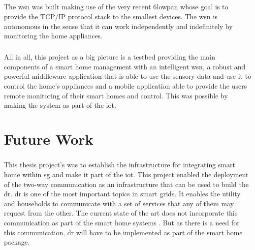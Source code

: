\documentclass[oneside,12pt,a4paper,final]{book}
\begin{document}
\paragraph{}
The \gls{wsn} was built making use of the very recent \gls{6lowpan} whose goal is to provide the TCP/IP protocol stack to the smallest devices. The \gls{wsn} is autonomous in the sense that it can work independently and indefinitely by monitoring the home appliances. 
\paragraph{}
All in all, this project as a big picture is a testbed providing the main components of a smart home management with an intelligent \gls{wsn}, a robust and powerful middleware application that is able to use the sensory data and use it to control the home's appliances and a mobile application able to provide the users remote monitoring of their smart homes and control. This was possible by making the system as part of the \gls{iot}.
\chapter{Future Work}
\paragraph{}
This thesis project's was to establish the infrastructure for integrating smart home within \gls{sg} and make it part of the \gls{iot}. This project enabled the deployment of the two-way communication as an infrastructure that can be used to build the \gls{dr}. \gls{dr} is one of the most important topics in smart grids. It enables the utility and households to communicate with a set of services that any of them may request from the other. The current state of the art does not incorporate this communication as part of the smart home systems \cite{ref15}. But as there is a need for this communication, \gls{dr} will have to be implemented as part of the smart home package.
\end{document}
